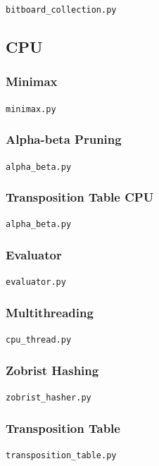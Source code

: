 \documentclass[../main/main.tex]{subfiles}
\begin{document}
\noindent\verb|bitboard_collection.py|


\subsection{CPU}
\subsubsection{Minimax}
\noindent\verb|minimax.py|


\subsubsection{Alpha-beta Pruning}
\noindent\verb|alpha_beta.py|


\subsubsection{Transposition Table CPU}
\noindent\verb|alpha_beta.py|


\subsubsection{Evaluator}
\noindent\verb|evaluator.py|


\subsubsection{Multithreading}
\noindent\verb|cpu_thread.py|


\subsubsection{Zobrist Hashing}
\noindent\verb|zobrist_hasher.py|


\subsubsection{Transposition Table}
\noindent\verb|transposition_table.py|

\end{document}
